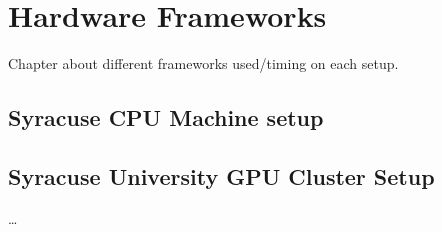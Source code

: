 \chapter{Hardware Frameworks}
Chapter about different frameworks used/timing on each setup.
\section{Syracuse CPU Machine setup}
\section{Syracuse University GPU Cluster Setup}
\dots
